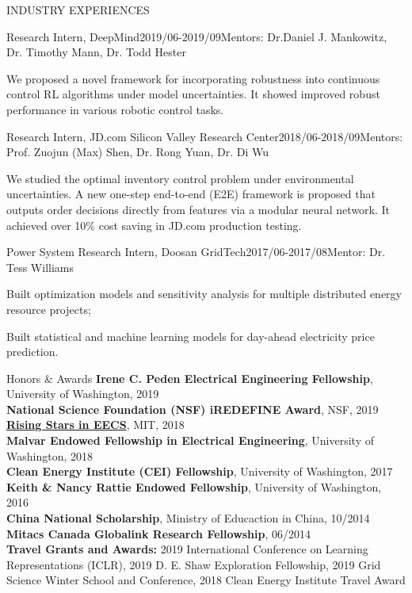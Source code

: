 \documentclass{resume} %
\begin{document}
\begin{rSection}{INDUSTRY EXPERIENCES}
	\begin{rSubsection}{Research Intern, DeepMind}{2019/06-2019/09}{Mentors: Dr.Daniel J. Mankowitz, Dr. Timothy Mann, Dr. Todd Hester}
		
		\item We proposed a novel framework for incorporating robustness into continuous control RL algorithms under model uncertainties. It showed improved robust performance in various robotic control tasks.
	\end{rSubsection}
	\begin{rSubsection}{Research Intern, JD.com Silicon Valley Research Center}{2018/06-2018/09}{Mentors: Prof. Zuojun (Max) Shen, Dr. Rong Yuan, Dr. Di Wu}{}
		
		\item We studied the optimal inventory control problem under environmental uncertainties. A new one-step end-to-end (E2E) framework is proposed that outputs order decisions directly from features via a modular neural network. It achieved over 10\% cost saving in JD.com production testing.
	\end{rSubsection}
	\begin{rSubsection}{Power System Research Intern, Doosan GridTech}{2017/06-2017/08}{Mentor: Dr. Tess Williams}{}    
		\item Built optimization models and sensitivity analysis for multiple distributed energy resource projects;
		\item Built statistical and machine learning models for day-ahead electricity price prediction.
	\end{rSubsection}
\end{rSection}
\begin{rSection}{Honors \& Awards}
	\textbf{Irene C. Peden Electrical Engineering Fellowship}, University of Washington, 2019\\
	\textbf{National Science Foundation (NSF) iREDEFINE Award}, NSF, 2019 \\
	\textbf{\href{https://risingstars18-eecs.mit.edu/}{Rising Stars in EECS}}, MIT, 2018 \\
	\textbf{Malvar Endowed Fellowship in Electrical Engineering}, University of Washington, 2018\\
	\textbf{Clean Energy Institute (CEI) Fellowship}, University of Washington, 2017\\
	\textbf{Keith \& Nancy Rattie Endowed Fellowship}, University of Washington, 2016\\
	\textbf{China National Scholarship}, Ministry of Educaction 
	in China, 10/2014 \\
	\textbf{Mitacs Canada Globalink Research Fellowship}, 06/2014\\
	\textbf{Travel Grants and Awards:} 2019 International Conference on Learning Representations (ICLR), 2019 D. E. Shaw Exploration Fellowship, 2019 Grid Science Winter School and Conference,  2018 Clean Energy Institute Travel Award
\end{rSection}
\end{document}
